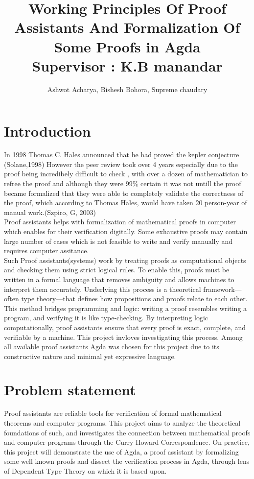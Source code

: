 \documentclass{article}
\title{
    {Working Principles Of Proof Assistants And Formalization Of Some Proofs in Agda}\\
    {\large Supervisor : K.B manandar}\\


    }
\author{ Ashwot Acharya, Bishesh Bohora, Supreme chaudary}
\begin{document}
\maketitle

\pagebreak
\section{Introduction}
In 1998 Thomas C. Hales announced that he had proved the kepler conjecture (Solane,1998) However the peer review took over 4 years especially due to the proof being incredibely difficult to check , with over a dozen of mathematician to refree the proof and although 
they were 99\% certain it was not untill the proof became formalized that they were able to completely validate the correctness of the proof, which according to Thomas Hales, would have taken 20 person-year of manual work.(Szpiro, G, 2003)
\\Proof assistants helps with formalization of mathematical proofs in computer which enables for their verification digitally.
Some exhaustive proofs may contain large number of cases which is not feasible to write and verify manually and requires computer assitance.\\ 
Such Proof assistants(systems) work by treating proofs as computational objects and checking them using strict logical rules. To enable this, proofs must be written in a formal language that removes ambiguity and allows machines to interpret them accurately. Underlying this process is a theoretical framework—often type theory—that defines how propositions and proofs relate to each other.
\\
This method bridges programming and logic: writing a proof resembles writing a program, and verifying it is like type-checking. By interpreting logic computationally, proof assistants ensure that every proof is exact, complete, and verifiable by a machine. This project invloves investigating this process. Among all available proof assistants Agda was chosen for this project due to its constructive nature and minimal yet expressive language.
\section{Problem statement}
Proof assistants are reliable tools for verification of formal mathematical theorems and computer programs. This project aims to analyze the theoretical foundations of such, and investigates the connection between mathematical proofs and computer programs through the Curry Howard Correspondence. On practice, this project will demonstrate the use of Agda, a proof assistant by formalizing some well known proofs and dissect the verification process in Agda, through lens of Dependent Type Theory on which it is based upon. 
\end{document}
